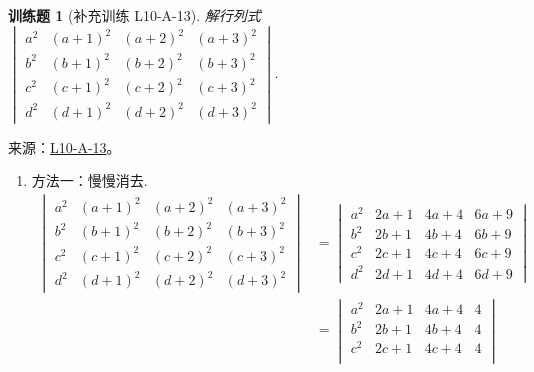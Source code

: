 \documentclass[UTF8,12pt,a4paper,fontset=fandol]{ctexart}
\newtheorem{exercise}{训练题}[section]
\begin{document}
\begin{exercise}[补充训练 L10-A-13]\label{prob:L10-A-13}
解行列式 $ \begin{vmatrix}
                a^{2} & (a+1)^{2} & (a+2)^{2} & (a+3)^{2} \\
                b^{2} & (b+1)^{2} & (b+2)^{2} & (b+3)^{2} \\
                c^{2} & (c+1)^{2} & (c+2)^{2} & (c+3)^{2} \\
                d^{2} & (d+1)^{2} & (d+2)^{2} & (d+3)^{2}
            \end{vmatrix} $.
\end{exercise}
\noindent 来源：\href{https://github.com/yhwu-is/Linear-Algebra-Left-Undone/blob/new/%E8%AE%B2%E4%B9%89/%E4%B8%93%E9%A2%98/10%20%E8%A1%8C%E5%88%97%E5%BC%8F.tex}{L10-A-13}。
\begin{solve}
\begin{enumerate}
                \item 方法一：慢慢消去.
                      \begin{align*}
                          \begin{vmatrix}
                              a^{2} & (a+1)^{2} & (a+2)^{2} & (a+3)^{2} \\
                              b^{2} & (b+1)^{2} & (b+2)^{2} & (b+3)^{2} \\
                              c^{2} & (c+1)^{2} & (c+2)^{2} & (c+3)^{2} \\
                              d^{2} & (d+1)^{2} & (d+2)^{2} & (d+3)^{2}
                          \end{vmatrix}
                           & = \begin{vmatrix}
                                   a^{2} & 2a+1 & 4a+4 & 6a+9 \\
                                   b^{2} & 2b+1 & 4b+4 & 6b+9 \\
                                   c^{2} & 2c+1 & 4c+4 & 6c+9 \\
                                   d^{2} & 2d+1 & 4d+4 & 6d+9
                               \end{vmatrix} \\
                           & = \begin{vmatrix}
                                   a^{2} & 2a+1 & 4a+4 & 4 \\
                                   b^{2} & 2b+1 & 4b+4 & 4 \\
                                   c^{2} & 2c+1 & 4c+4 & 4 \\

\end{vmatrix}
\end{align*}
\end{enumerate}
\end{solve}
\end{document}
